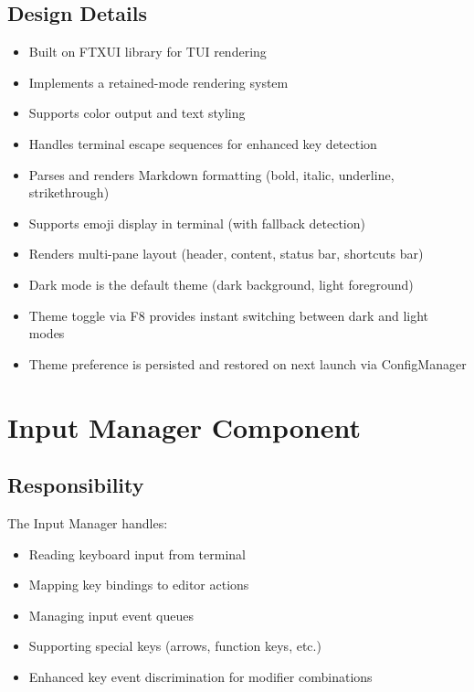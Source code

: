 \documentclass[12pt,a4paper,oneside,openany]{report}
\begin{document}
\subsection{Design Details}

\begin{itemize}
	\item Built on FTXUI library for TUI rendering
	\item Implements a retained-mode rendering system
	\item Supports color output and text styling
	\item Handles terminal escape sequences for enhanced key detection
	\item Parses and renders Markdown formatting (bold, italic, underline, strikethrough)
	\item Supports emoji display in terminal (with fallback detection)
	\item Renders multi-pane layout (header, content, status bar, shortcuts bar)
	\item Dark mode is the default theme (dark background, light foreground)
	\item Theme toggle via F8 provides instant switching between dark and light modes
	\item Theme preference is persisted and restored on next launch via ConfigManager
\end{itemize}

\section{Input Manager Component}

\subsection{Responsibility}

The Input Manager handles:

\begin{itemize}
	\item Reading keyboard input from terminal
	\item Mapping key bindings to editor actions
	\item Managing input event queues
	\item Supporting special keys (arrows, function keys, etc.)
	\item Enhanced key event discrimination for modifier combinations
\end{itemize}
\end{document}
